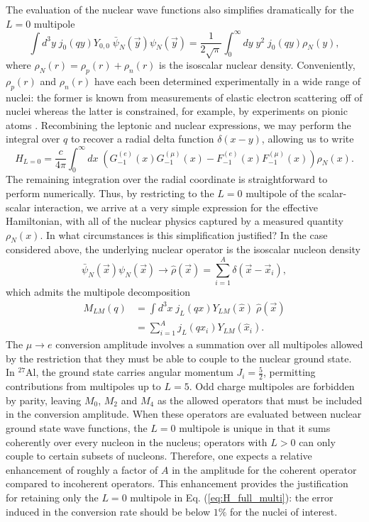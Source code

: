 \documentclass[12pt,letterpaper]{book}
\begin{document}
The evaluation of the nuclear wave functions also simplifies dramatically for the $L=0$ multipole
\begin{equation}
\int d^3y\;j_0(qy)Y_{0,0}\;\bar{\psi}_N(\vec{y})\psi_N(\vec{y})=\frac{1}{2\sqrt{\pi}}\int_0^{\infty}dy\;y^2\;j_0(qy)\rho_N(y),
\end{equation}
where $\rho_N(r)=\rho_p(r)+\rho_n(r)$ is the isoscalar nuclear density. Conveniently, $\rho_p(r)$ and $\rho_n(r)$ have each been determined experimentally in a wide range of nuclei: the former is known from measurements of elastic electron scattering off of nuclei \cite{DEVRIES1987495} whereas the latter is constrained, for example, by experiments on pionic atoms \cite{Garcia-Recio:1991ocp}. Recombining the leptonic and nuclear expressions, we may perform the integral over $q$ to recover a radial delta function $\delta(x-y)$, allowing us to write
\begin{equation}
H_{L=0}=\frac{c}{4\pi}\int_0^{\infty}dx\;\left(G_{-1}^{(e)}(x)G_{-1}^{(\mu)}(x)-F_{-1}^{(e)}(x)F_{-1}^{(\mu)}(x)\right)\rho_N(x).
\label{eq:H_coherent}
\end{equation}
The remaining integration over the radial coordinate is straightforward to perform numerically. Thus, by restricting to the $L=0$ multipole of the scalar-scalar interaction, we arrive at a very simple expression for the effective Hamiltonian, with all of the nuclear physics captured by a measured quantity $\rho_N(x)$. In what circumstances is this simplification justified? In the case considered above, the underlying nuclear operator is the isoscalar nucleon density
\begin{equation}
\bar{\psi}_N(\vec{x})\psi_N(\vec{x})\rightarrow\hat{\rho}(\vec{x})=\sum_{i=1}^A\delta(\vec{x}-\vec{x}_i),
\end{equation} 
which admits the multipole decomposition
\begin{equation}
\begin{split}
M_{LM}(q)&=\int d^3x\;j_L(qx)Y_{LM}(\hat{x})\;\hat{\rho}(\vec{x})\\
&=\sum_{i=1}^Aj_L(qx_i)Y_{LM}(\hat{x}_i).
\end{split}
\end{equation}
The $\mu\rightarrow e$ conversion amplitude involves a summation over all multipoles allowed by the restriction that they must be able to couple to the nuclear ground state. In $^{27}$Al, the ground state carries angular momentum $J_i=\frac{5}{2}$, permitting contributions from multipoles up to $L=5$. Odd charge multipoles are forbidden by parity, leaving $M_0$, $M_2$ and $M_4$ as the allowed operators that must be included in the conversion amplitude. When these operators are evaluated between nuclear ground state wave functions, the $L=0$ multipole is unique in that it sums coherently over every nucleon in the nucleus; operators with $L>0$ can only couple to certain subsets of nucleons. Therefore, one expects a relative enhancement of roughly a factor of $A$ in the amplitude for the coherent operator compared to incoherent operators. This enhancement provides the justification for retaining only the $L=0$ multipole in Eq. (\ref{eq:H_full_multi}): the error induced in the conversion rate should be below $1\%$ for the nuclei of interest. 
\end{document}
